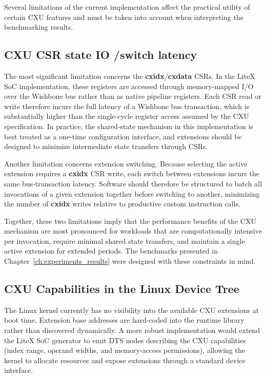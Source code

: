Several limitations of the current implementation affect the practical utility of
certain CXU features and must be taken into account when interpreting the benchmarking
results.

\subsection{CXU CSR state IO /switch latency}
\label{subsec:cxu_csr_latency}

The most significant limitation concerns the \textbf{cxidx}/\textbf{cxdata}
CSRs.
In the LiteX SoC implementation, these registers are accessed through memory-mapped I/O
over the Wishbone bus rather than as native pipeline registers.
Each CSR read or write therefore incurs the full latency of a Wishbone bus transaction,
which is substantially higher than the single-cycle register access assumed by the CXU
specification.
In practice, the shared-state mechanism in this implementation is best treated as a
one-time configuration interface, and extensions should be designed to minimize
intermediate state transfers through CSRs.

Another limitation concerns extension switching.
Because selecting the active extension requires a \textbf{cxidx} CSR write, each
switch between extensions incurs the same bus-transaction latency.
Software should therefore be structured to batch all invocations of a given extension
together before switching to another, minimizing the number of \textbf{cxidx} writes
relative to productive custom instruction calls.

Together, these two limitations imply that the performance benefits of the CXU
mechanism are most pronounced for workloads that are computationally intensive per
invocation, require minimal shared state transfers, and maintain a single active
extension for extended periods.
The benchmarks presented in Chapter~\ref{ch:experiments_results} were designed with
these constraints in mind.

\subsection{CXU Capabilities in the Linux Device Tree}
\label{subsec:lim_dts}

The Linux kernel currently has no visibility into the available CXU extensions at
boot time. Extension base addresses are hard-coded into the runtime library rather
than discovered dynamically. A more robust implementation would extend the LiteX
SoC generator to emit DTS nodes describing the CXU capabilities (index range,
operand widths, and memory-access permissions), allowing the kernel to allocate
resources and expose extensions through a standard device interface.

